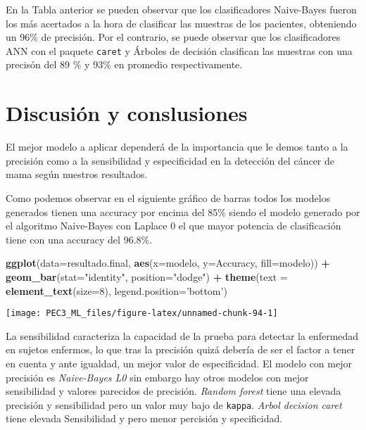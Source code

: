 \documentclass[
]{article}
\newenvironment{Shaded}{\begin{snugshade}}{\end{snugshade}}
\newcommand{\DataTypeTok}[1]{\textcolor[rgb]{0.13,0.29,0.53}{#1}}
\newcommand{\DecValTok}[1]{\textcolor[rgb]{0.00,0.00,0.81}{#1}}
\newcommand{\KeywordTok}[1]{\textcolor[rgb]{0.13,0.29,0.53}{\textbf{#1}}}
\newcommand{\NormalTok}[1]{#1}
\newcommand{\OperatorTok}[1]{\textcolor[rgb]{0.81,0.36,0.00}{\textbf{#1}}}
\newcommand{\StringTok}[1]{\textcolor[rgb]{0.31,0.60,0.02}{#1}}
\begin{document}
En la Tabla anterior se pueden observar que los clasificadores
Naive-Bayes fueron los más acertados a la hora de clasificar las
muestras de los pacientes, obteniendo un 96\% de precisión. Por el
contrario, se puede observar que los clasificadores ANN con el paquete
\texttt{caret} y Árboles de decisión clasifican las muestras con una
precisón del 89 \% y 93\% en promedio respectivamente.

\hypertarget{discusiuxf3n-y-conslusiones}{%
\section{Discusión y conslusiones}\label{discusiuxf3n-y-conslusiones}}

El mejor modelo a aplicar dependerá de la importancia que le demos tanto
a la precisión como a la sensibilidad y especificidad en la detección
del cáncer de mama según nuestros resultados.

Como podemos observar en el siguiente gráfico de barras todos los
modelos generados tienen una accuracy por encima del 85\% siendo el
modelo generado por el algoritmo Naive-Bayes con Laplace 0 el que mayor
potencia de clasificación tiene con una accuracy del 96.8\%.

\begin{Shaded}
\begin{Highlighting}[]
\KeywordTok{ggplot}\NormalTok{(}\DataTypeTok{data=}\NormalTok{resultado.final, }\KeywordTok{aes}\NormalTok{(}\DataTypeTok{x=}\NormalTok{modelo, }\DataTypeTok{y=}\NormalTok{Accuracy, }\DataTypeTok{fill=}\NormalTok{modelo)) }\OperatorTok{+}\StringTok{ }
\StringTok{    }\KeywordTok{geom_bar}\NormalTok{(}\DataTypeTok{stat=}\StringTok{"identity"}\NormalTok{, }\DataTypeTok{position=}\StringTok{"dodge"}\NormalTok{) }\OperatorTok{+}\StringTok{  }\KeywordTok{theme}\NormalTok{(}\DataTypeTok{text =} \KeywordTok{element_text}\NormalTok{(}\DataTypeTok{size=}\DecValTok{8}\NormalTok{),}
                                                         \DataTypeTok{legend.position=}\StringTok{'bottom'}\NormalTok{) }
\end{Highlighting}
\end{Shaded}

\begin{center}\texttt{[image: PEC3\_ML\_files/figure-latex/unnamed-chunk-94-1]} \end{center}

La sensibilidad caracteriza la capacidad de la prueba para detectar la
enfermedad en sujetos enfermos, lo que tras la precisión quizá debería
de ser el factor a tener en cuenta y ante igualdad, un mejor valor de
especificidad. El modelo con mejor precisión es \emph{Naive-Bayes L0}
sin embargo hay otros modelos con mejor sensibilidad y valores parecidos
de precisión. \emph{Random forest} tiene una elevada precisión y
sensibilidad pero un valor muy bajo de \texttt{kappa}. \emph{Arbol
decision caret} tiene elevada Sensibilidad y pero menor percisión y
specificidad.
\end{document}
